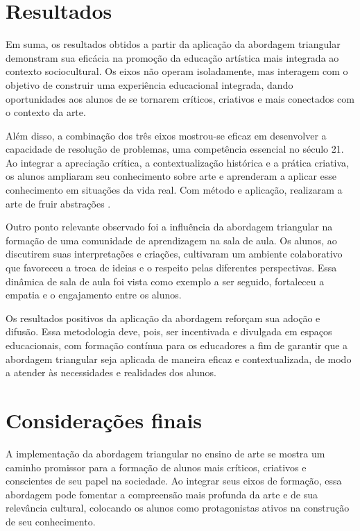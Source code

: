 \documentclass[portuguese]{textolivre}
\begin{document}
\section{Resultados}\label{sec-organizacao-latex}
Em suma, os resultados obtidos a partir da aplicação da abordagem triangular demonstram sua eficácia na promoção da educação artística mais integrada ao contexto sociocultural. Os eixos não operam isoladamente, mas interagem com o objetivo de construir uma experiência educacional integrada, dando oportunidades aos alunos de se tornarem críticos, criativos e mais conectados com o contexto da arte.

Além disso, a combinação dos três eixos mostrou-se eficaz em desenvolver a capacidade de resolução de problemas, uma competência essencial no século 21. Ao integrar a apreciação crítica, a contextualização histórica e a prática criativa, os alunos ampliaram seu conhecimento sobre arte e aprenderam a aplicar esse conhecimento em situações da vida real. Com método e aplicação, realizaram a arte de fruir abstrações \cite{minayo2010pesquisa,bourdieu1996distincao,dewey1934art}.

Outro ponto relevante observado foi a influência da abordagem triangular na formação de uma comunidade de aprendizagem na sala de aula. Os alunos, ao discutirem suas interpretações e criações, cultivaram um ambiente colaborativo que favoreceu a troca de ideias e o respeito pelas diferentes perspectivas. Essa dinâmica de sala de aula foi vista como exemplo a ser seguido, fortaleceu a empatia e o engajamento entre os alunos.

Os resultados positivos da aplicação da abordagem reforçam sua adoção e difusão. Essa metodologia deve, pois, ser incentivada e divulgada em espaços educacionais, com formação contínua para os educadores a fim de garantir que a abordagem triangular seja aplicada de maneira eficaz e contextualizada, de modo a atender às necessidades e realidades dos alunos.

\section{Considerações finais}\label{sec-titulo}
A implementação da abordagem triangular no ensino de arte se mostra um caminho promissor para a formação de alunos mais críticos, criativos e conscientes de seu papel na sociedade. Ao integrar seus eixos de formação, essa abordagem pode fomentar a compreensão mais profunda da arte e de sua relevância cultural, colocando os alunos como protagonistas ativos na construção de seu conhecimento.
\end{document}

